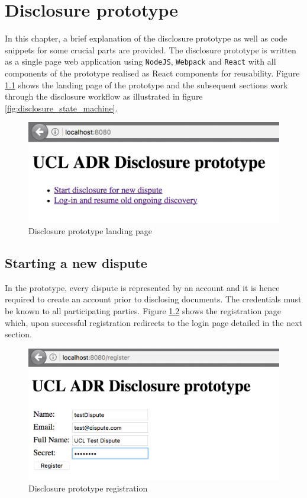 \documentclass[12pt,msc,a4paper,oneside]{ucl_thesis}
\begin{document}
\chapter{Disclosure prototype} \label{appendix:website}
In this chapter, a brief explanation of the disclosure prototype as well as code snippets for some crucial parts are provided. The disclosure prototype is written as a single page web application using \texttt{NodeJS}, \texttt{Webpack} and \texttt{React} with all components of the prototype realised as React components for reusability. Figure \ref{fig:proto_landing_page} shows the landing page of the prototype and the subsequent sections work through the disclosure workflow as illustrated in figure \ref{fig:disclosure_state_machine}.

\begin{figure}[H]
    \includegraphics[width=1.0\textwidth]{./figures/proto_landing_page.png}
    \caption{Disclosure prototype landing page}
    \label{fig:proto_landing_page}
\end{figure}

\section{Starting a new dispute}
In the prototype, every dispute is represented by an account and it is hence required to create an account prior to disclosing documents. The credentials must be known to all participating parties. Figure \ref{fig:proto_register} shows the registration page which, upon successful registration redirects to the login page detailed in the next section.

\begin{figure}[H]
    \includegraphics[width=1.0\textwidth]{./figures/proto_register.png}
    \caption{Disclosure prototype registration}
    \label{fig:proto_register}
\end{figure}
\end{document}
